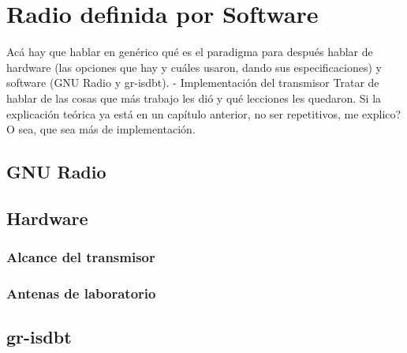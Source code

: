 \chapter{Radio definida por Software}

Acá hay que hablar en genérico qué es el paradigma para después hablar de hardware (las opciones que hay y cuáles usaron, dando sus especificaciones) y software (GNU Radio y gr-isdbt). 
- Implementación del transmisor
Tratar de hablar de las cosas que más trabajo les dió y qué lecciones les quedaron. Si la explicación teórica ya está en un capítulo anterior, no ser repetitivos, me explico? O sea, que sea más de implementación.

\section{GNU Radio}
\section{Hardware}
	\subsection{Alcance del transmisor}
	\subsection{Antenas de laboratorio}
\section{gr-isdbt}